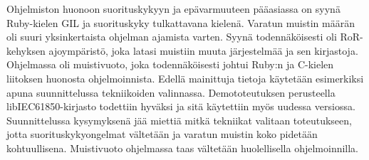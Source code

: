 Ohjelmiston huonoon suorituskykyyn ja epävarmuuteen pääasiassa on syynä Ruby-kielen GIL ja suorituskyky tulkattavana kielenä. Varatun muistin määrän oli suuri yksinkertaista ohjelman ajamista varten. Syynä todennäköisesti oli RoR-kehyksen ajoympäristö, joka latasi muistiin muuta järjestelmää ja sen kirjastoja. Ohjelmassa oli muistivuoto, joka todennäköisesti johtui Ruby:n ja C-kielen liitoksen huonosta ohjelmoinnista. Edellä mainittuja tietoja käytetään esimerkiksi apuna suunnittelussa tekniikoiden valinnassa. Demototeutuksen perusteella libIEC61850-kirjasto todettiin hyväksi ja sitä käytettiin myös uudessa versiossa. Suunnittelussa kysymyksenä jää miettiä mitkä tekniikat valitaan toteutukseen, jotta suorituskykyongelmat vältetään ja varatun muistin koko pidetään kohtuullisena. Muistivuoto ohjelmassa taas vältetään huolellisella ohjelmoinnilla.